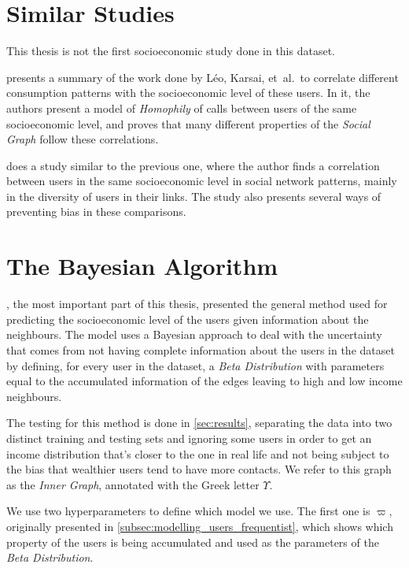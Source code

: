 \section{Similar Studies}

This thesis is not the first socioeconomic study done in this dataset.

 presents a summary of the work done by Léo, Karsai, et~al.\ to correlate different consumption patterns with the socioeconomic level of these users.
In it, the authors present a model of \emph{Homophily} of calls between users of the same socioeconomic level, and proves that many different properties of the \emph{Social Graph} follow these correlations.

 does a study similar to the previous one, where the author finds a correlation between users in the same socioeconomic level in social network patterns, mainly in the diversity of users in their links.
The study also presents several ways of preventing bias in these comparisons.

\section{The Bayesian Algorithm}

, the most important part of this thesis, presented the general method used for predicting the socioeconomic level of the users given information about the neighbours.
The model uses a Bayesian approach to deal with the uncertainty that comes from not having complete information about the users in the dataset by defining, for every user in the dataset, a \emph{Beta Distribution} with parameters equal to the accumulated information of the edges leaving to high and low income neighbours.

The testing for this method is done in \cref{sec:results}, separating the data into two distinct training and testing sets and ignoring some users in order to get an income distribution that's closer to the one in real life and not being subject to the bias that wealthier users tend to have more contacts.
We refer to this graph as the \emph{Inner Graph}, annotated with the Greek letter $\Upsilon$.

We use two hyperparameters to define which model we use. The first one is $\varpi$, originally presented in \cref{subsec:modelling_users_frequentist}, which shows which property of the users is being accumulated and used as the parameters of the \emph{Beta Distribution}.

